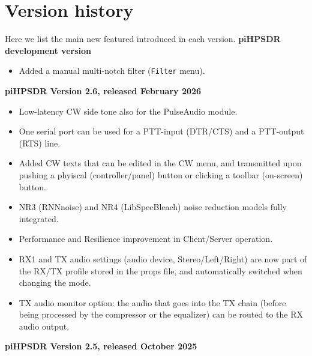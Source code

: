 \documentclass[12pt]{book}
\def\bltt#1{\texttt{\color{blue}#1}}
\def\pH{pi\-HPSDR\xspace}
\begin{document}
\clearpage
\section{Version history}
\label{sec:versionhistory}
Here we list the main new featured introduced in each version.
\bigskip
\textbf{\pH development version}
\begin{itemize}
\item{Added a manual multi-notch filter (\bltt{Filter} menu).}
\end{itemize}
\medskip
\textbf{\pH Version 2.6, released February 2026}
\begin{itemize}
\item{Low-latency CW side tone also for the PulseAudio module.}
\item{One serial port can be used for a PTT-input (DTR/CTS) and a PTT-output (RTS) line.}
\item{Added CW texts that can be edited in the CW menu, and transmitted upon pushing
a phyiscal (controller/panel) button or clicking a toolbar (on-screen) button.}
\item{NR3 (RNNnoise) and NR4 (LibSpecBleach) noise reduction models fully integrated.}
\item{Performance and Resilience improvement in Client/Server operation.}
\item{RX1 and TX audio settings (audio device, Stereo/Left/Right) are now part of the RX/TX profile
stored in the props file, and automatically switched when changing the mode.}
\item{TX audio monitor option: the audio that goes into the TX chain (before being processed
by the compressor or the equalizer) can be routed
to the RX audio output.}
\end{itemize}
\clearpage
\textbf{\pH Version 2.5, released October 2025}
\end{document}
